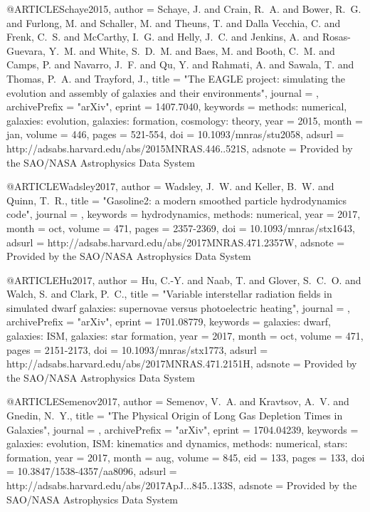 \documentclass[useAMS,usenatbib]{mnras}
\begin{document}
{{{{{{{{{{{{{{{@ARTICLE{Schaye2015,
   author = {{Schaye}, J. and {Crain}, R.~A. and {Bower}, R.~G. and {Furlong}, M. and 
	{Schaller}, M. and {Theuns}, T. and {Dalla Vecchia}, C. and 
	{Frenk}, C.~S. and {McCarthy}, I.~G. and {Helly}, J.~C. and 
	{Jenkins}, A. and {Rosas-Guevara}, Y.~M. and {White}, S.~D.~M. and 
	{Baes}, M. and {Booth}, C.~M. and {Camps}, P. and {Navarro}, J.~F. and 
	{Qu}, Y. and {Rahmati}, A. and {Sawala}, T. and {Thomas}, P.~A. and 
	{Trayford}, J.},
    title = "{The EAGLE project: simulating the evolution and assembly of galaxies and their environments}",
  journal = {\mnras},
archivePrefix = "arXiv",
   eprint = {1407.7040},
 keywords = {methods: numerical, galaxies: evolution, galaxies: formation, cosmology: theory},
     year = 2015,
    month = jan,
   volume = 446,
    pages = {521-554},
      doi = {10.1093/mnras/stu2058},
   adsurl = {http://adsabs.harvard.edu/abs/2015MNRAS.446..521S},
  adsnote = {Provided by the SAO/NASA Astrophysics Data System}
}

@ARTICLE{Wadsley2017,
   author = {{Wadsley}, J.~W. and {Keller}, B.~W. and {Quinn}, T.~R.},
    title = "{Gasoline2: a modern smoothed particle hydrodynamics code}",
  journal = {\mnras},
 keywords = {hydrodynamics, methods: numerical},
     year = 2017,
    month = oct,
   volume = 471,
    pages = {2357-2369},
      doi = {10.1093/mnras/stx1643},
   adsurl = {http://adsabs.harvard.edu/abs/2017MNRAS.471.2357W},
  adsnote = {Provided by the SAO/NASA Astrophysics Data System}
}

@ARTICLE{Hu2017,
   author = {{Hu}, C.-Y. and {Naab}, T. and {Glover}, S.~C.~O. and {Walch}, S. and 
	{Clark}, P.~C.},
    title = "{Variable interstellar radiation fields in simulated dwarf galaxies: supernovae versus photoelectric heating}",
  journal = {\mnras},
archivePrefix = "arXiv",
   eprint = {1701.08779},
 keywords = {galaxies: dwarf, galaxies: ISM, galaxies: star formation},
     year = 2017,
    month = oct,
   volume = 471,
    pages = {2151-2173},
      doi = {10.1093/mnras/stx1773},
   adsurl = {http://adsabs.harvard.edu/abs/2017MNRAS.471.2151H},
  adsnote = {Provided by the SAO/NASA Astrophysics Data System}
}

@ARTICLE{Semenov2017,
   author = {{Semenov}, V.~A. and {Kravtsov}, A.~V. and {Gnedin}, N.~Y.},
    title = "{The Physical Origin of Long Gas Depletion Times in Galaxies}",
  journal = {\apj},
archivePrefix = "arXiv",
   eprint = {1704.04239},
 keywords = {galaxies: evolution, ISM: kinematics and dynamics, methods: numerical, stars: formation},
     year = 2017,
    month = aug,
   volume = 845,
      eid = {133},
    pages = {133},
      doi = {10.3847/1538-4357/aa8096},
   adsurl = {http://adsabs.harvard.edu/abs/2017ApJ...845..133S},
  adsnote = {Provided by the SAO/NASA Astrophysics Data System}
}

}}}}}}}}}}}}}}}
\end{document}
